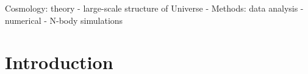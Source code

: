 \documentclass[a4,useAMS,usenatbib,usegraphicx]{mn2e}
\begin{document}
\begin{keywords}
Cosmology: theory - large-scale structure of Universe -
Methods: data analysis - numerical - N-body simulations
\end{keywords}


\section{Introduction}
\label{sec:introduction}

\citep{NFW,Taylor2001}



\end{document}
